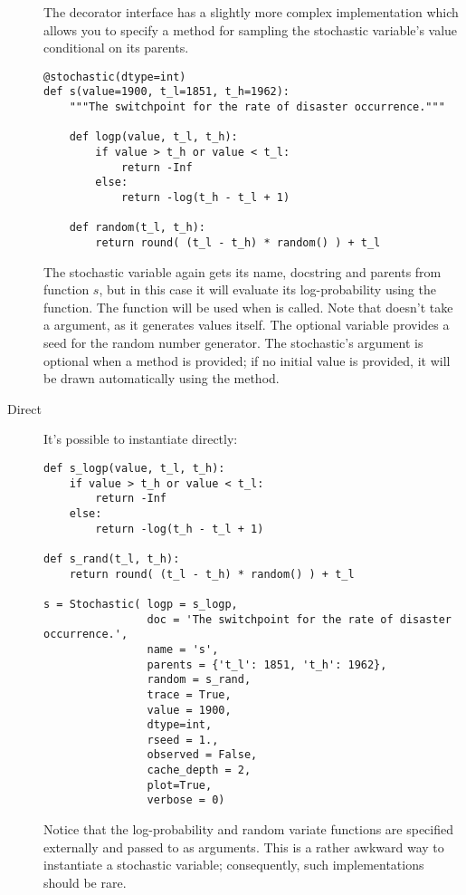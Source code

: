 \begin{description}
    The decorator interface has a slightly more complex implementation which allows you to specify a  method for sampling the stochastic variable's value conditional on its parents.
    \begin{verbatim}
@stochastic(dtype=int)
def s(value=1900, t_l=1851, t_h=1962):
    """The switchpoint for the rate of disaster occurrence."""

    def logp(value, t_l, t_h):
        if value > t_h or value < t_l:
            return -Inf
        else:
            return -log(t_h - t_l + 1) 
            
    def random(t_l, t_h):
        return round( (t_l - t_h) * random() ) + t_l

    \end{verbatim}
The stochastic variable again gets its name, docstring and parents from function $s$, but in this case it will evaluate its log-probability using the  function. The  function will be used when  is called. Note that  doesn't take a  argument, as it generates values itself. The optional  variable provides a seed for the random number generator. The stochastic's  argument is optional when a  method is provided; if no initial value is provided, it will be drawn automatically using the  method.

    \item[Direct] It's possible to instantiate  directly:
\begin{verbatim}
def s_logp(value, t_l, t_h):
    if value > t_h or value < t_l:
        return -Inf
    else:
        return -log(t_h - t_l + 1) 

def s_rand(t_l, t_h):
    return round( (t_l - t_h) * random() ) + t_l

s = Stochastic( logp = s_logp, 
                doc = 'The switchpoint for the rate of disaster occurrence.',
                name = 's', 
                parents = {'t_l': 1851, 't_h': 1962},
                random = s_rand,                 
                trace = True,                 
                value = 1900,
                dtype=int,
                rseed = 1., 
                observed = False,
                cache_depth = 2,
                plot=True,
                verbose = 0)
\end{verbatim}
Notice that the log-probability and random variate functions are specified externally and passed to  as arguments. This is a rather awkward way to instantiate a stochastic variable; consequently, such implementations should be rare.

\end{description}


